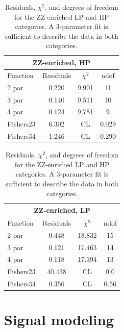 \begin{table}[h!]
\centering
\begin{tabular}{|l c c c |}
\hline
\multicolumn{4}{|c|}{ZZ-enriched, HP}\\
\hline
Function & Residuals & $\chi^2$ & ndof \\
\hline
2 par & 0.220 & 9.901 & 11 \\
3 par & 0.140 & 9.511 & 10 \\
4 par & 0.124 & 9.781 & 9 \\
\hline
\hline
Fishers23 & 6.302& CL & 0.029\\
Fishers34 & 1.246& CL & 0.290\\
\hline
\end{tabular}
\quad
\begin{tabular}{|l c c c |}
\hline
\multicolumn{4}{|c|}{ZZ-enriched, LP}\\
\hline
Function & Residuals & $\chi^2$ & ndof \\
\hline
2 par & 0.448 & 18.832 & 15 \\
3 par & 0.121 & 17.463 & 14 \\
4 par & 0.118 & 17.394 & 13 \\
\hline
\hline
Fishers23 & 40.438& CL & 0.0\\
Fishers34 & 0.356& CL & 0.56\\
\hline
\end{tabular}
\caption{Residuals, $\chi^{2}$, and degrees of freedom for the ZZ-enriched LP and HP categories. A 3-parameter fit is sufficient to describe the data in both categories.}
\label{tab:ZZ_enriched}
\end{table}

\clearpage
\section{Signal modeling}
\label{sec:searchI:sig}

